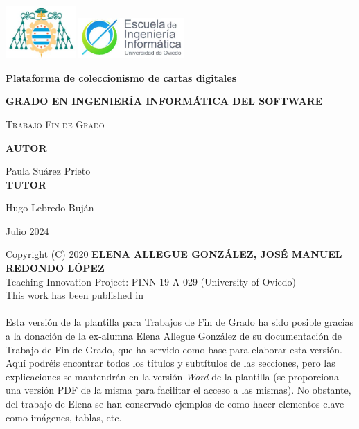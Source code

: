 \documentclass[11pt]{report} %
\begin{document}


\hypersetup{pageanchor=false}

\begin{titlepage}
	\centering
	\includegraphics[width=0.2\textwidth]{EscudoUniovi}
	\hspace{3 cm}
	\includegraphics[width=0.3\textwidth]{EscudoEscuela}
	\par\vspace{1cm}
	
	\vspace{1.5cm}
	{\huge\bfseries Plataforma de coleccionismo de cartas digitales\par}
	\vspace{2cm}
	{\large \textbf{GRADO EN INGENIERÍA INFORMÁTICA DEL SOFTWARE} \par}
	\vspace{1cm}
	{\scshape\Large Trabajo Fin de Grado\par}
   	
  \vspace{2cm}
	\textbf{AUTOR}\par
	Paula Suárez Prieto \\
	\vspace{1.5cm}
	\textbf{TUTOR}\par
	Hugo Lebredo Buján
	\vfill
	
	{\large Julio 2024 \par}
\end{titlepage}

\newpage
\pagestyle{plain}
Copyright (C) 2020 \textbf{ELENA ALLEGUE GONZÁLEZ, JOSÉ MANUEL REDONDO LÓPEZ} \\
Teaching Innovation Project: PINN-19-A-029 (University of Oviedo)\\
This work has been published in \cite{RedondoPlantillasRG19} \cite{RedondoUCO20}\\
\\
Esta versión de la plantilla para Trabajos de Fin de Grado ha sido posible gracias a la donación de la ex-alumna Elena Allegue González de su documentación de Trabajo de Fin de Grado, que ha servido como base para elaborar esta versión. Aquí podréis encontrar todos los títulos y subtítulos de las secciones, pero las explicaciones se mantendrán en la versión \textit{Word} de la plantilla (se proporciona una versión PDF de la misma para facilitar el acceso a las mismas). No obstante, del trabajo de Elena se han conservado ejemplos de como hacer elementos clave como imágenes, tablas, etc.
\end{document}
